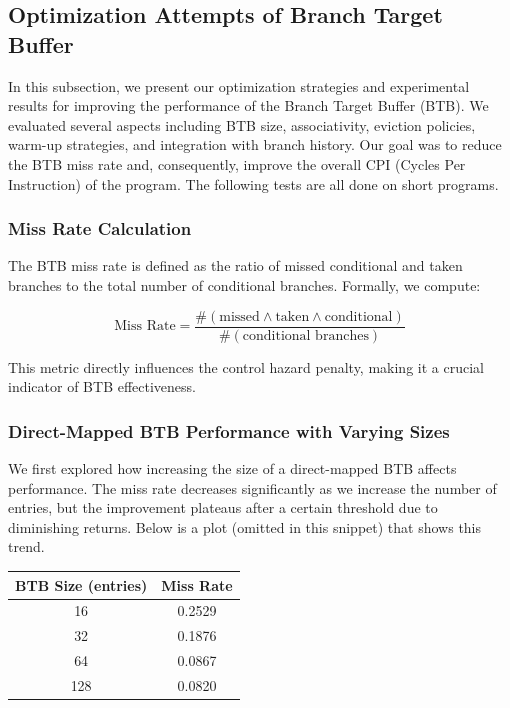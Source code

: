 \subsection{Optimization Attempts of Branch Target Buffer}

In this subsection, we present our optimization strategies and experimental results for improving the performance of the Branch Target Buffer (BTB). We evaluated several aspects including BTB size, associativity, eviction policies, warm-up strategies, and integration with branch history. Our goal was to reduce the BTB miss rate and, consequently, improve the overall CPI (Cycles Per Instruction) of the program. The following tests are all done on short programs.

\subsubsection{Miss Rate Calculation}

The BTB miss rate is defined as the ratio of missed conditional and taken branches to the total number of conditional branches. Formally, we compute:

\[
\text{Miss Rate} = \frac{\#(\text{missed} \land \text{taken} \land \text{conditional})}{\#(\text{conditional branches})}
\]

This metric directly influences the control hazard penalty, making it a crucial indicator of BTB effectiveness.

\subsubsection{Direct-Mapped BTB Performance with Varying Sizes}

We first explored how increasing the size of a direct-mapped BTB affects performance. The miss rate decreases significantly as we increase the number of entries, but the improvement plateaus after a certain threshold due to diminishing returns. Below is a plot (omitted in this snippet) that shows this trend.

\begin{center}
\begin{tabular}{|c|c|}
\hline
\textbf{BTB Size (entries)} & \textbf{Miss Rate} \\
\hline
16 & 0.2529 \\
32 & 0.1876 \\
64 & 0.0867 \\
128 & 0.0820 \\
\hline
\end{tabular}
\end{center}

